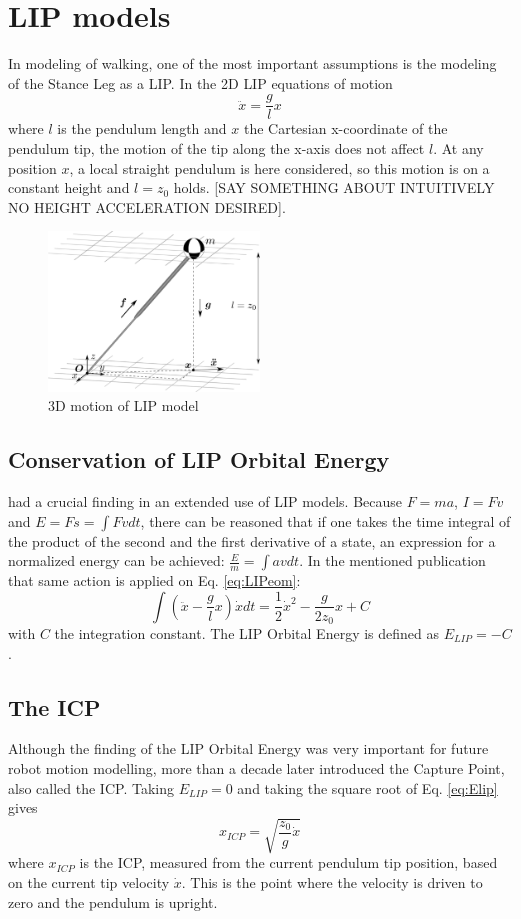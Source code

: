 \section{\ac{LIP} models}
In modeling of walking, one of the most important assumptions is the modeling of the Stance Leg as a \ac{LIP}. In the \ac{2D} \ac{LIP} equations of motion
\begin{equation}
\ddot{x}=\frac{g}{l}x
\label{eq:LIPeom}
\end{equation}
where $l$ is the pendulum length and $x$ the Cartesian x-coordinate of the pendulum tip, the motion of the tip along the x-axis does not affect $l$. At any position $x$, a local straight pendulum is here considered, so this motion is on a constant height and $l=z_0$  holds. [SAY SOMETHING ABOUT INTUITIVELY NO HEIGHT ACCELERATION DESIRED].
\begin{figure}[h]
\centering
\includegraphics[width=0.5\textwidth]{STYLESTUFF/3DCoMwithoutfoot.png}
\caption{\ac{3D} motion of \ac{LIP} model}
\label{fig:3dlip}
\end{figure}
\subsection{Conservation of \ac{LIP} Orbital Energy}
\cite{kajita1992dynamic} had a crucial finding in an extended use of \ac{LIP} models. Because $F=ma$, $I=Fv$ and $E = Fs = \int Fv dt$, there can be reasoned that if one takes the time integral of the product of the second and the first derivative of a state, an expression for a normalized energy can be achieved: $\frac{E}{m}=\int av dt$. In the mentioned publication that same action is applied on Eq. \eqref{eq:LIPeom}:
\begin{equation}
\int (\ddot{x}-\frac{g}{l}x)\dot{x} dt = \frac{1}{2}\dot{x}^2-\frac{g}{2z_0}x +C
\label{eq:Elip}
\end{equation}
with $C$ the integration constant. The \ac{LIP} Orbital Energy is defined as $E_{LIP}=-C$. 
\subsection{The \ac{ICP}}
Although the finding of the \ac{LIP} Orbital Energy was very important for future robot motion modelling, more than a decade later \cite{pratt2006capture} introduced the Capture Point, also called the \acl{ICP}. Taking $E_{LIP}=0$ and taking the square root of Eq.  \eqref{eq:Elip} gives
\begin{equation}
x_{ICP}=\sqrt{ \frac{z_0}{g}\dot{x} }
\label{eq:cp}
\end{equation}
where $x_{ICP}$ is the \ac{ICP}, measured from the current pendulum tip position, based on the current tip velocity $\dot{x}$. This is the point where the velocity is driven to zero and the pendulum is upright. 
